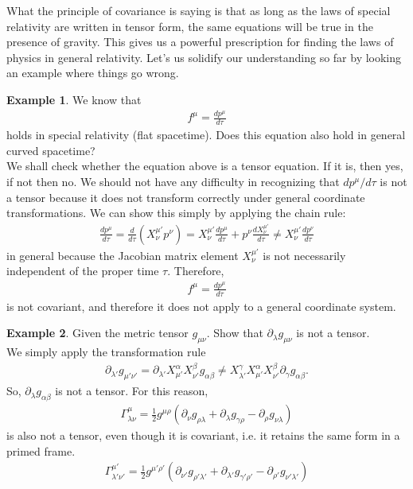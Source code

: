 \documentclass{article}
\theoremstyle{definition}
\newtheorem{exmp}{Example}[section]
\begin{document}
What the principle of covariance is saying is that as long as the laws of special relativity are written in tensor form, the same equations will be true in the presence of gravity. This gives us a powerful prescription for finding the laws of physics in general relativity. Let's us solidify our understanding so far by looking an example where things go wrong.\\
\begin{exmp}
	We know that 
	\begin{align*}
	f^\mu = \frac{dp^\mu}{d\tau}
	\end{align*}
	holds in special relativity (flat spacetime). Does this equation also hold in general curved spacetime?\\
	
	We shall check whether the equation above is a tensor equation. If it is, then yes, if not then no. We should not have any difficulty in recognizing that $dp^\mu/d\tau$ is not a tensor because it does not transform correctly under general coordinate transformations. We can show this simply by applying the chain rule:
	\begin{align*}
	\frac{dp^\mu}{d\tau} = \frac{d}{d\tau}\left(X^{\mu'}_\nu p^{\nu} \right) = X^{\mu'}_\nu\frac{dp^\mu}{d\tau} + p^\nu\frac{dX^{\mu'}_\nu}{d\tau} \neq X^{\mu'}_\nu \frac{dp^\nu}{d\tau}
	\end{align*}
	in general because the Jacobian matrix element $X^{\mu'}_\nu$ is not necessarily independent of the proper time $\tau$. Therefore, 
	\begin{align*}
	f^\mu = \frac{dp^\mu}{d\tau}
	\end{align*}
	is not covariant, and therefore it does not apply to a general coordinate system.\\
\end{exmp}
\begin{exmp}
	Given the metric tensor $g_{\mu\nu}$. Show that $\partial_\lambda g_{\mu\nu}$ is not a tensor.\\
	
	We simply apply the transformation rule
	\begin{align*}
	\partial_{\lambda'}g_{\mu'\nu'} = \partial_{\lambda'}X^{\alpha}_{\mu'}X^{\beta}_{\nu'}g_{\alpha\beta} \neq X^{\gamma}_{\lambda'}X^{\alpha}_{\mu'}X^{\beta}_{\nu'}\partial_{\gamma}g_{\alpha\beta}.
	\end{align*}
	So, $\partial_{\lambda}g_{\alpha\beta}$ is not a tensor. For this reason, 
	\begin{align*}
	\Gamma^{\mu}_{\lambda\nu} = \frac{1}{2}g^{\mu\rho}\left( \partial_{\nu}g_{\rho\lambda} + \partial_{\lambda}g_{\gamma\rho} - \partial_{\rho}g_{\nu\lambda}\right) 
	\end{align*}
	is also not a tensor, even though it is covariant, i.e. it retains the same form in a primed frame.
	\begin{align*}
	\Gamma^{\mu'}_{\lambda'\nu'} = \frac{1}{2}g^{\mu'\rho'}\left( \partial_{\nu'}g_{\rho'\lambda'} + \partial_{\lambda'}g_{\gamma'\rho'} - \partial_{\rho'}g_{\nu'\lambda'}\right)
	\end{align*}
\end{exmp}
\end{document}
